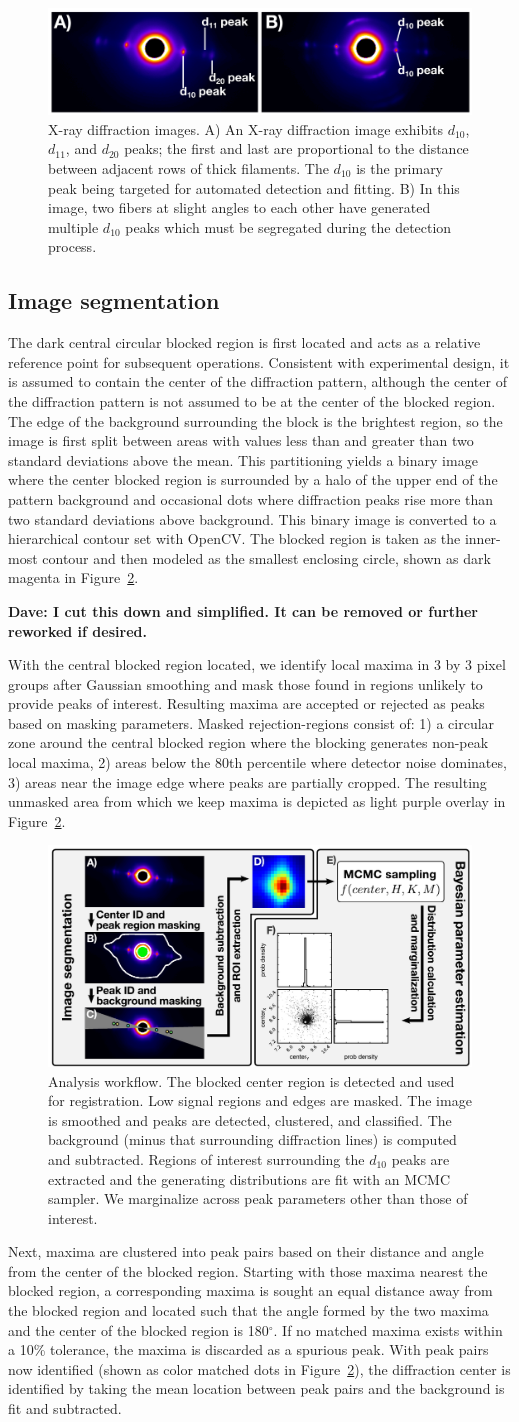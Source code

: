 \documentclass{sig-alternate}
\newcommand{\note}[2]{
    \textbf{\textcolor{#1}{#2}}
}
\newcommand{\dave}[1]{\note{PineGreen}{Dave: #1}}
\newcommand{\figureimgs}{
\begin{figure}[tbp]
  \centering
  \includegraphics[width=\linewidth]{figures/x_ray_image_montage}
  \vspace{-12pt}
  \caption{\label{fig:imgs}
  	X-ray diffraction images.
    A) An X-ray diffraction image exhibits $d_{10}$, $d_{11}$, and
    $d_{20}$ peaks; the first and last are proportional to the
    distance between adjacent rows of thick filaments. The $d_{10}$ is
    the primary peak being targeted for automated detection and
    fitting. B) In this image, two fibers at slight angles to each
    other have generated multiple $d_{10}$ peaks which must be
    segregated during the detection process.  
	}
	\vspace{-2pt}
\end{figure}
}
\newcommand{\figureworkflow}{
\begin{figure}[tbp]
  \centering
  \includegraphics[width=\linewidth]{figures/img_analysis}
  \vspace{-8pt}
  \caption{\label{fig:workflow}
  	Analysis workflow.
    The blocked center region is detected and used for registration.
    Low signal regions and edges are masked. The image is smoothed and
    peaks are detected, clustered, and classified. The background
    (minus that surrounding diffraction lines) is computed and
    subtracted. Regions of interest surrounding the $d_{10}$ peaks are
    extracted and the generating distributions are fit with an MCMC
    sampler. We marginalize across peak parameters other than those of
    interest.  
	}
	\vspace{-2pt}
\end{figure}
}
\begin{document}
\figureimgs



\subsection{Image segmentation}

The dark central circular blocked region is first located and acts as
a relative reference point for subsequent operations. Consistent with
experimental design, it is assumed to contain the center of the
diffraction pattern, although the center of the diffraction pattern is
not assumed to be at the center of the blocked region. The edge of the
background surrounding the block is the brightest region, so the image
is first split between areas with values less than and greater than
two standard deviations above the mean. This partitioning yields a
binary image where the center blocked region is surrounded by a halo
of the upper end of the pattern background and occasional dots where
diffraction peaks rise more than two standard deviations above
background. This binary image is converted to a hierarchical contour
set with OpenCV. The blocked region is taken as the inner-most contour
and then modeled as the smallest enclosing circle, shown as dark
magenta in Figure~\ref{fig:workflow}. 


\dave{I cut this down and simplified. It can be removed or further
reworked if desired.}
With the central blocked region located, we identify local maxima in 3
by 3 pixel groups after Gaussian smoothing and mask those found in
regions unlikely to provide peaks of interest.  Resulting maxima are
accepted or rejected as peaks based on masking parameters.  Masked
rejection-regions consist of: 1) a circular zone around the central
blocked region where the blocking generates non-peak local maxima, 2)
areas below the 80th percentile where detector noise dominates, 3)
areas near the image edge where peaks are partially cropped. The
resulting unmasked area from which we keep maxima is depicted as light
purple overlay in Figure~\ref{fig:workflow}.

\figureworkflow

Next, maxima are clustered into peak pairs based on their distance
and angle from the center of the blocked region. Starting with those
maxima nearest the blocked region, a corresponding maxima is sought an
equal distance away from the blocked region and located such that the
angle formed by the two maxima and the center of the blocked region is
180$^\circ$. If no matched maxima exists within a 10\% tolerance, the
maxima is discarded as a spurious peak. With peak pairs now identified
(shown as color matched dots in Figure~\ref{fig:workflow}), the
diffraction center is identified by taking the mean location between
peak pairs and the background is fit and subtracted. 
\end{document}
